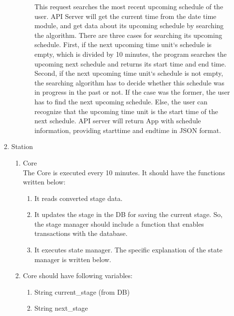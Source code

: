 \documentclass[conference]{IEEEtran}
\begin{document}
\begin{enumerate}[label=\arabic*.]
\begin{enumerate}[label=\arabic*.]
\begin{enumerate}[label=\alph*.]
\begin{enumerate}[label=\roman*.]
            This request searches the most recent upcoming schedule of the user. API Server will get the current time from the date time module, and get data about its upcoming schedule by searching the algorithm. There are three cases for searching its upcoming schedule. First, if the next upcoming time unit`s schedule is empty, which is divided by 10 minutes, the program searches the upcoming next schedule and returns its start time and end time. Second, if the next upcoming time unit`s schedule is not empty, the searching algorithm has to decide whether this schedule was in progress in the past or not. If the case was the former, the user has to find the next upcoming schedule. Else, the user can recognize that the upcoming time unit is the start time of the next schedule. API server will return App with schedule information, providing starttime and endtime in JSON format. \\
        \end{enumerate}
    \end{enumerate}
    \item {\large{Station}} \\
    \begin{enumerate}[label=\alph*.]
        \item {\large{Core}} \\
        The Core is executed every 10 minutes. It should have the functions written below: \\
        \begin{enumerate}[label=\roman*.]
            \item {\large{It reads converted stage data.}}
            \item {\large{It updates the stage in the DB for saving the current stage. So, the stage manager should include a function that enables transactions with the database.}}
            \item {\large{It executes state manager. The specific explanation of the state manager is written below. }} \\ 
        \end{enumerate}
        \item {\large{Core should have following variables: }} \\
        \begin{enumerate}[label=\roman*.]
            \item {\large{String current\_stage (from DB)}}
            \item {\large{String next\_stage}}\\

\end{enumerate}
\end{enumerate}
\end{enumerate}
\end{enumerate}
\end{document}
